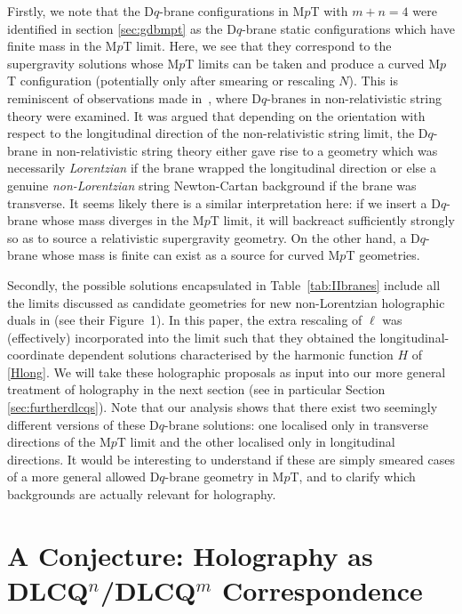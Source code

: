 \documentclass[11pt]{article}
\renewcommand{\emph}[1]{\textit{#1}}
\begin{document}
Firstly, we note that the D$q$-brane configurations in M$p$T with $m + n =4$ were identified in section \ref{sec:gdbmpt} as the D$q$-brane static configurations which have finite mass in the M$p$T limit. 
Here, we see that they correspond to the supergravity solutions whose M$p$T limits can be taken and produce a curved M$p$T configuration (potentially only after smearing or rescaling $N$).
This is reminiscent of observations made in~\cite{Guijosa:2023qym,Avila:2023aey}, where D$q$-branes in non-relativistic string theory were examined. 
It was argued that depending on the orientation with respect to the longitudinal direction of the non-relativistic string limit, the D$q$-brane in non-relativistic string theory either gave rise to a geometry which was necessarily \emph{Lorentzian} if the brane wrapped the longitudinal direction or else a genuine \emph{non-Lorentzian} string Newton-Cartan background if the brane was transverse.
It seems likely there is a similar interpretation here: if we insert a D$q$-brane whose mass diverges in the M$p$T limit, it will backreact sufficiently strongly so as to source a relativistic supergravity geometry. On the other hand, a D$q$-brane whose mass is finite can exist as a source for curved M$p$T geometries.

Secondly, the possible solutions encapsulated in Table~\ref{tab:IIbranes} include all the limits discussed as candidate geometries for new non-Lorentzian holographic duals in \cite{Lambert:2024yjk} (see their Figure~1).
In this paper, the extra rescaling of $\ell$ was (effectively) incorporated into the limit such that they obtained the longitudinal-coordinate dependent solutions characterised by the harmonic function $H$ of \eqref{Hlong}.
We will take these holographic proposals as input into our more general treatment of holography in the next section (see in particular Section \ref{sec:furtherdlcqs}).
Note that our analysis shows that there exist two seemingly different versions of these D$q$-brane solutions: one localised only in transverse directions of the M$p$T limit and the other localised only in longitudinal directions.
It would be interesting to understand if these are simply smeared cases of a more general allowed D$q$-brane geometry in M$p$T, and to clarify which backgrounds are actually relevant for holography.


\section{A Conjecture: Holography as \texorpdfstring{DLCQ${}^n$/DLCQ${}^{m}$}{DLCQn/DLCQm} Correspondence} \label{sec:chdlcq}
\end{document}
